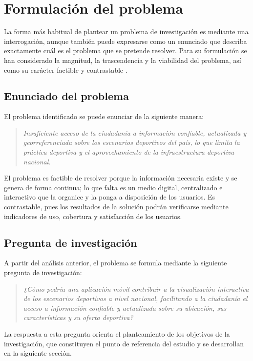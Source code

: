 
\section{Formulaci\'on del problema}

La forma m\'as habitual de plantear un problema de investigaci\'on es mediante
una interrogaci\'on, aunque tambi\'en puede expresarse como un enunciado que
describa exactamente cu\'al es el problema que se pretende resolver. Para su
formulaci\'on se han considerado la magnitud, la trascendencia y la viabilidad
del problema, as\'i como su car\'acter factible y contrastable
\citep{arias2012}.

\subsection{Enunciado del problema}

El problema identificado se puede enunciar de la siguiente manera:

\begin{quote}
\textit{Insuficiente acceso de la ciudadan\'ia a informaci\'on confiable,
actualizada y georreferenciada sobre los escenarios deportivos del pa\'is, lo
que limita la pr\'actica deportiva y el aprovechamiento de la
infraestructura deportiva nacional.}
\end{quote}

El problema es factible de resolver porque la informaci\'on necesaria existe y
se genera de forma continua; lo que falta es un medio digital, centralizado e
interactivo que la organice y la ponga a disposici\'on de los usuarios. Es
contrastable, pues los resultados de la soluci\'on podr\'an verificarse mediante
indicadores de uso, cobertura y satisfacci\'on de los usuarios.

\subsection{Pregunta de investigaci\'on}

A partir del an\'alisis anterior, el problema se formula mediante la siguiente
pregunta de investigaci\'on:

\begin{quote}
\textit{¿C\'omo podr\'ia una aplicaci\'on m\'ovil contribuir a la
visualizaci\'on interactiva de los escenarios deportivos a nivel nacional,
facilitando a la ciudadan\'ia el acceso a informaci\'on confiable y actualizada
sobre su ubicaci\'on, sus caracter\'isticas y su oferta deportiva?}
\end{quote}

La respuesta a esta pregunta orienta el planteamiento de los objetivos de la
investigaci\'on, que constituyen el punto de referencia del estudio y se
desarrollan en la siguiente secci\'on.
